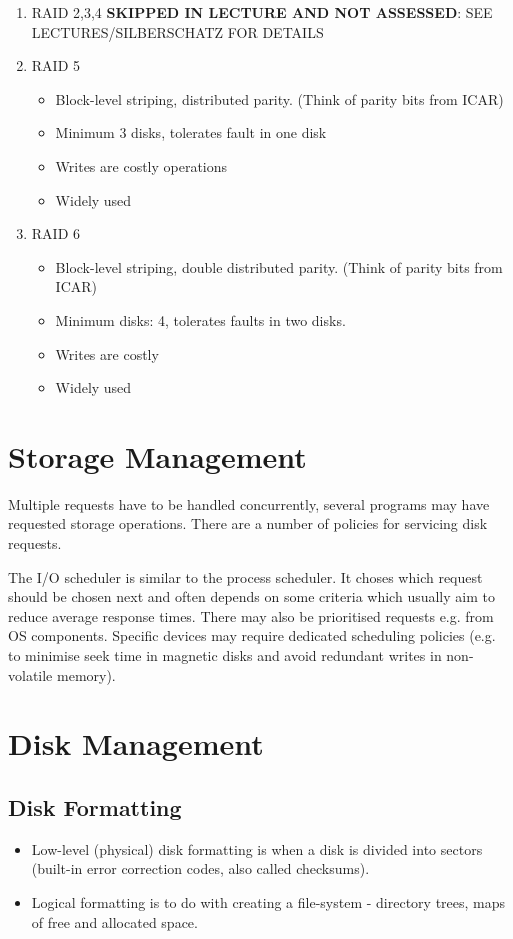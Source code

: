 \documentclass[11pt]{article}
\begin{document}
\begin{enumerate}
\item RAID 2,3,4
\label{sec:orgf30365f}
\textbf{SKIPPED IN LECTURE AND NOT ASSESSED}: SEE LECTURES/SILBERSCHATZ FOR DETAILS

\item RAID 5
\label{sec:orgf6a0085}
\begin{itemize}
\item Block-level striping, distributed parity. (Think of parity bits from ICAR)
\item Minimum 3 disks, tolerates fault in one disk
\item Writes are costly operations
\item Widely used
\end{itemize}

\item RAID 6
\label{sec:orge0377ca}
\begin{itemize}
\item Block-level striping, double distributed parity. (Think of parity bits from ICAR)
\item Minimum disks: 4, tolerates faults in two disks.
\item Writes are costly
\item Widely used
\end{itemize}
\end{enumerate}

\section{Storage Management}
\label{sec:orgfae50c7}
Multiple requests have to be handled concurrently, several programs may have requested storage operations.
There are a number of policies for servicing disk requests.

The I/O scheduler is similar to the process scheduler.
It choses which request should be chosen next and often depends on some criteria which usually aim to reduce average response times.
There may also be prioritised requests e.g. from OS components.
Specific devices may require dedicated scheduling policies (e.g. to minimise seek time in magnetic disks and avoid redundant writes in non-volatile memory).
\section{Disk Management}
\label{sec:org75dc5fa}
\subsection{Disk Formatting}
\label{sec:org7e5044f}
\begin{itemize}
\item Low-level (physical) disk formatting is when a disk is divided into sectors (built-in error correction codes, also called checksums).
\item Logical formatting is to do with creating a file-system - directory trees, maps of free and allocated space.
\end{itemize}
\end{document}

